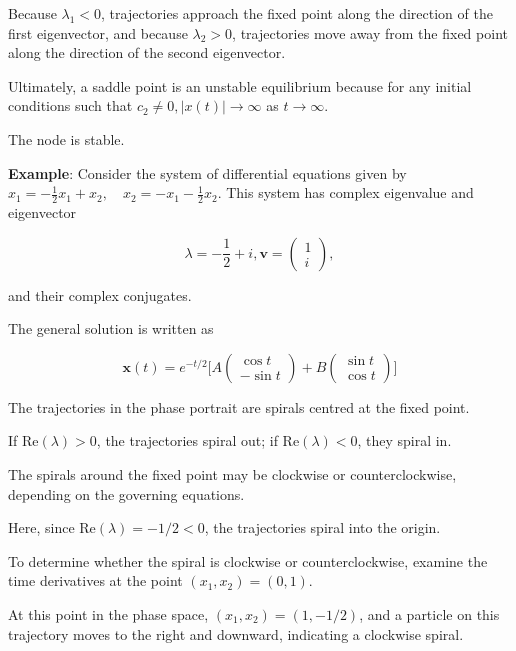 \begin{paracol}{2}
Because $\lambda_1 < 0$, trajectories approach the fixed point along the direction of the first eigenvector, and because $\lambda_2 > 0$, trajectories move away from the fixed point along the direction of the second eigenvector.

Ultimately, a saddle point is an unstable equilibrium because for any initial conditions such that $c_2 \neq 0, |x(t)| \rightarrow \infty$ as $t \rightarrow \infty$.

The node is stable.

\switchcolumn

\textbf{Example}: Consider the system of differential equations given by $x_1 = - \frac{1}{2} x_1 + x_2, \quad x_2 = - x_1 - \frac{1}{2} x_2$. This system has complex eigenvalue and eigenvector

$$\lambda = - \frac{1}{2} + i, \mathbf{v} = \begin{pmatrix}
    1 \\ i
\end{pmatrix},$$

and their complex conjugates.

The general solution is written as

$$\mathbf{x}(t) = e^{-t / 2} \Bigg[ A \begin{pmatrix}
    \cos{t} \\ - \sin{t}
\end{pmatrix} + B \begin{pmatrix}
    \sin{t} \\ \cos{t}
\end{pmatrix} \Bigg]$$

The trajectories in the phase portrait are spirals centred at the fixed point.

If $\text{Re}(\lambda) > 0$, the trajectories spiral out; if $\text{Re}(\lambda) < 0$, they spiral in.

The spirals around the fixed point may be clockwise or counterclockwise, depending on the governing equations.

Here, since $\text{Re}(\lambda) = -1/2 < 0$, the trajectories spiral into the origin.

To determine whether the spiral is
clockwise or counterclockwise, examine the time derivatives at the point $(x_1, x_2) = (0, 1)$.

At this point in the phase space, $(x_1, x_2) = (1, - 1/2)$, and a particle on this trajectory moves to the right and downward, indicating a clockwise spiral. 

\end{paracol}

